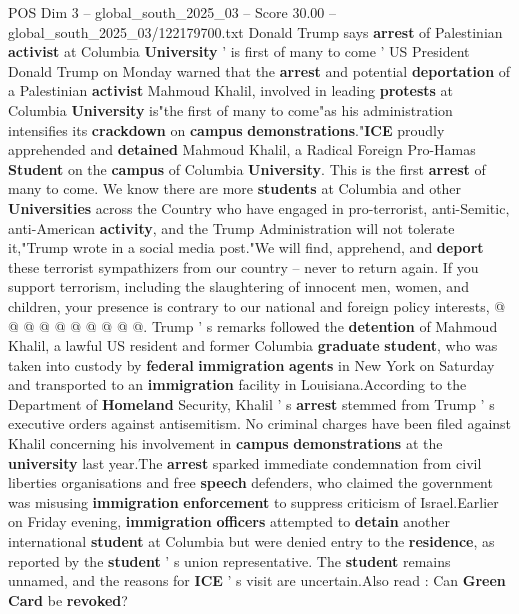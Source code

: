 \begin{textsample}{POS Dim 3 – global\_south\_2025\_03 – Score 30.00 – global\_south\_2025\_03/122179700.txt}  \label{ex:f3_pos_036}
Donald Trump says \textbf{arrest} of Palestinian \textbf{activist} at Columbia \textbf{University} ' is first of many to come ' US President Donald Trump on Monday warned that the \textbf{arrest} and potential \textbf{deportation} of a Palestinian \textbf{activist} Mahmoud Khalil, involved in leading \textbf{protests} at Columbia \textbf{University} is"the first of many to come"as his administration intensifies its \textbf{crackdown} on \textbf{campus} \textbf{demonstrations}."\textbf{ICE} proudly apprehended and \textbf{detained} Mahmoud Khalil, a Radical Foreign Pro-Hamas \textbf{Student} on the \textbf{campus} of Columbia \textbf{University}.
This is the first \textbf{arrest} of many to come.
We know there are more \textbf{students} at Columbia and other \textbf{Universities} across the Country who have engaged in pro-terrorist, anti-Semitic, anti-American \textbf{activity}, and the Trump Administration will not tolerate it,"Trump wrote in a social media post."We will find, apprehend, and \textbf{deport} these terrorist sympathizers from our country -- never to return again.
If you support terrorism, including the slaughtering of innocent men, women, and children, your presence is contrary to our national and foreign policy interests, @ @ @ @ @ @ @ @ @ @.
Trump ' s remarks followed the \textbf{detention} of Mahmoud Khalil, a lawful US resident and former Columbia \textbf{graduate} \textbf{student}, who was taken into custody by \textbf{federal} \textbf{immigration} \textbf{agents} in New York on Saturday and transported to an \textbf{immigration} facility in Louisiana.According to the Department of \textbf{Homeland} Security, Khalil ' s \textbf{arrest} stemmed from Trump ' s executive orders against antisemitism.
No criminal charges have been filed against Khalil concerning his involvement in \textbf{campus} \textbf{demonstrations} at the \textbf{university} last year.The \textbf{arrest} sparked immediate condemnation from civil liberties organisations and free \textbf{speech} defenders, who claimed the government was misusing \textbf{immigration} \textbf{enforcement} to suppress criticism of Israel.Earlier on Friday evening, \textbf{immigration} \textbf{officers} attempted to \textbf{detain} another international \textbf{student} at Columbia but were denied entry to the \textbf{residence}, as reported by the \textbf{student} ' s union representative.
The \textbf{student} remains unnamed, and the reasons for \textbf{ICE} ' s visit are uncertain.Also read : Can \textbf{Green} \textbf{Card} be \textbf{revoked}?

\end{textsample}
